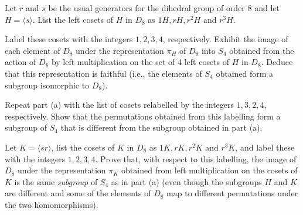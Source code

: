 \begin{exercise} \label{ex4.2.5}
	Let $r$ and $s$ be the usual generators for the dihedral group of order 8 and let $H = \langle s \rangle$. List the left cosets of $H$ in $D_8$ as $1H, rH, r^2H$ and $r^3H$.
	\begin{subproblems}
		\item Label these cosets with the integers $1,2,3,4$, respectively. Exhibit the image of each element of $D_8$ under the representation $\pi_H$ of $D_8$ into $S_4$ obtained from the action of $D_8$ by left multiplication on the set of 4 left cosets of $H$ in $D_8$. Deduce that this representation is faithful (i.e., the elements of $S_4$ obtained form a subgroup isomorphic to $D_8$).
		\item Repeat part (a) with the list of cosets relabelled by the integers $1,3,2,4$, respectively. Show that the permutations obtained from this labelling form a subgroup of $S_4$ that is different from the subgroup obtained in part (a).
		\item Let $K = \langle sr \rangle$, list the cosets of $K$ in $D_8$ as $1K, rK, r^2K$ and $r^3K$, and label these with the integers $1,2,3,4$. Prove that, with respect to this labelling, the image of $D_8$ under the representation $\pi_K$ obtained from left multiplication on the cosets of $K$ is the same \emph{subgroup} of $S_4$ as in part (a) (even though the subgroups $H$ and $K$ are different and some of the elements of $D_8$ map to different permutations under the two homomorphisms).
	\end{subproblems}
\end{exercise}

